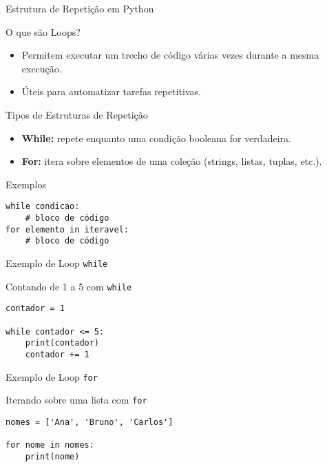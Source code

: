 \begin{frame}[fragile]{Estrutura de Repetição em Python}

    \begin{block}{O que são Loops?}
        \begin{itemize}
            \item Permitem executar um trecho de código várias vezes durante a mesma execução.
            \item Úteis para automatizar tarefas repetitivas.
        \end{itemize}
    \end{block}

    \vspace{0.5em}

    \begin{block}{Tipos de Estruturas de Repetição}
        \begin{itemize}
            \item \textbf{While:} repete enquanto uma condição booleana for verdadeira.
            \item \textbf{For:} itera sobre elementos de uma coleção (strings, listas, tuplas, etc.).
        \end{itemize}
    \end{block}

    \vspace{0.5em}

    \begin{block}{Exemplos}
        \begin{verbatim}
while condicao:
    # bloco de código
for elemento in iteravel:
    # bloco de código
\end{verbatim}
    \end{block}

\end{frame}


\begin{frame}[fragile]{Exemplo de Loop \texttt{while}}

    \begin{block}{Contando de 1 a 5 com \texttt{while}}
        \begin{verbatim}
contador = 1

while contador <= 5:
    print(contador)
    contador += 1
\end{verbatim}
    \end{block}

\end{frame}


\begin{frame}[fragile]{Exemplo de Loop \texttt{for}}

    \begin{block}{Iterando sobre uma lista com \texttt{for}}
        \begin{verbatim}
nomes = ['Ana', 'Bruno', 'Carlos']

for nome in nomes:
    print(nome)
\end{verbatim}
    \end{block}

\end{frame}

